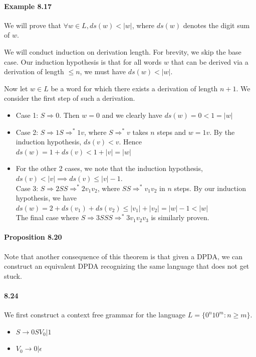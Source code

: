 \documentclass{article}
\begin{document}
\paragraph{Example 8.17} We will prove that $\forall w\in L, ds(w) < |w|$, where $ds(w)$ denotes the digit sum of $w$.

We will conduct induction on derivation length. For brevity, we skip the base case. Our induction hypothesis is that for all words $w$ that can be derived via a derivation of length $\leq n$, we must have $ds(w) < |w|$.

Now let $w\in L$ be a word for which there exists a derivation of length $n+1$. We consider the first step of such a derivation.

\begin{itemize}
	\item Case 1: $S\Rightarrow 0$. Then $w=0$ and we clearly have $ds(w) = 0 < 1 = |w|$
	\item Case 2: $S\Rightarrow 1S\Rightarrow^* 1v$, where $S\Rightarrow^* v$ takes $n$ steps and $w=1v$. By the induction hypothesis, $ds(v) < v$. Hence $ds(w) = 1 + ds(v) < 1 + |v| = |w|$
	\item For the other 2 cases, we note that the induction hypothesis, $ds(v) < |v|\implies ds(v)\leq |v|-1$.\\
	Case 3: $S\Rightarrow 2SS\Rightarrow^* 2v_1v_2$, where $SS\Rightarrow^* v_1v_2$ in $n$ steps. By our induction hypothesis, we have $ds(w) = 2 + ds(v_1) + ds(v_2) \leq |v_1| + |v_2| = |w| - 1 < |w|$\\
	The final case where $S\Rightarrow 3SSS\Rightarrow^* 3v_1v_2v_3$ is similarly proven.
\end{itemize}

\paragraph{Proposition 8.20} Note that another consequence of this theorem is that given a DPDA, we can construct an equivalent DPDA recognizing the same language that does not get stuck.

\paragraph{8.24}
We first construct a context free grammar for the language $L=\{0^n10^m : n\geq m\}$.

\begin{itemize}
	\item $S\rightarrow 0SV_0 | 1$
	\item $V_0\rightarrow 0 | \epsilon$
\end{itemize}
\end{document}
